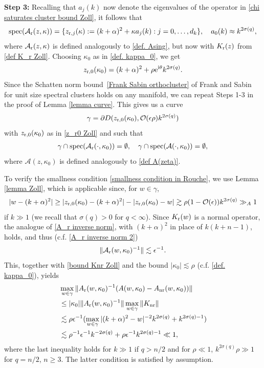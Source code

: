 \documentclass[12pt]{amsart}
\newcommand{\e}{{\rm e}}
\newcommand\eps{\epsilon}
\newcommand\I{\mathrm{i}}
\DeclareMathOperator{\spec}{spec}
\begin{document}
\textbf{Step 3:}
Recalling that $a_j(k)$ now denote the eigenvalues of the operator in \eqref{chi saturates cluster bound Zoll}, it follows that
\begin{align}
    \spec(\mathcal{A}_{\rm r}(z,\kappa))=\{z_{{\rm r},j}(\kappa):=(k+\alpha)^2+\kappa a_{j}(k): j=0,\ldots,d_k\},\quad a_0(k)\approx k^{2\sigma(q)},
\end{align}
where $\mathcal{A}_{\rm r}(z,\kappa)$ is defined analogously to \eqref{def. Asing}, but now with $K_{\rm r}(z)$ from \eqref{def K_r Zoll}. Choosing $\kappa_0$ as in \eqref{def. kappa_0}, we get
\begin{align}\label{z_r0 Zoll}
    z_{{\rm r},0}(\kappa_{0})=(k+\alpha)^2+\rho\e^{\I\theta}k^{2\sigma(q)}.
\end{align}
Since the Schatten norm bound~\eqref{Frank Sabin orthocluster} of Frank and Sabin~\cite{MR3682666} for unit size spectral clusters holds on any manifold, 
we can repeat Steps 1-3 in the proof of Lemma \ref{lemma curve}. This gives us a curve
\begin{align}
   \gamma=\partial D(z_{{\rm r},0}(\kappa_{0}),\mathcal{O}(\eps\rho) k^{2\sigma(q)})
\end{align}
with $z_{{\rm r},0}(\kappa_{0})$ as in \eqref{z_r0 Zoll} and such that
\begin{align}
    \gamma\cap \spec(\mathcal{A}_{\rm r}(\cdot,\kappa_0))=\emptyset,\quad \gamma\cap \spec(\mathcal{A}(\cdot,\kappa_0))=\emptyset,
\end{align}
where $\mathcal{A}(z,\kappa_0)$ is defined analogously to \eqref{def A(zeta)}. 

To verify the smallness condition \eqref{smallness condition in Rouche}, we use Lemma \ref{lemma Zoll}, which is applicable since, for $w\in\gamma$, 
\begin{align}
    |w-(k+\alpha)^2|\geq |z_{{\rm r},0}(\kappa_{0})-(k+\alpha)^2|-|z_{{\rm r},0}(\kappa_{0})-w|\gtrsim \rho(1-\mathcal{O}(\eps))k^{2\sigma(q)}\gg_A 1
\end{align}
if $k\gg 1$ (we recall that $\sigma(q)>0$ for $q<\infty$). Since $K_{\rm r}(w)$ is a normal operator, the analogue of \eqref{A_r inverse norm}, with $(k+\alpha)^2$ in place of $k(k+n-1)$, holds, and thus (c.f. \eqref{A_r inverse norm 2})
\begin{align*}
     \|\mathcal{A}_{\rm r}(w,\kappa_0)^{-1}\|\lesssim \eps^{-1}.
\end{align*}
This, together with \eqref{bound Knr Zoll} and the bound $|\kappa_0|\lesssim\rho$ (c.f. \eqref{def. kappa_0}), yields
\begin{align}
&\max_{w\in\gamma}\|A_{\rm r}(w,\kappa_{0})^{-1}(A(w,\kappa_{0})-A_{\rm nr}(w,\kappa_{0}))\|\\
&\leq |\kappa_0|\|A_{\rm r}(w,\kappa_{0})^{-1}\| \max_{w\in\gamma}\|K_{\rm nr}\|\\
&\lesssim\rho\eps^{-1}(\max_{w\in\gamma}|(k+\alpha)^2-w|^{-2}k^{2\sigma(q)}+k^{2\sigma(q)-1})\\
&\lesssim \rho^{-1}\eps^{-1}k^{-2\sigma(q)}+\rho\eps^{-1}k^{2\sigma(q)-1}
\ll 1,
\end{align}
where the last inequality holds for $k\gg 1$ if $q>n/2$ and for $\rho\ll 1$, $k^{2\sigma(q)}\rho\gg 1$ for $q=n/2$, $n\geq 3$. The latter condition is satisfied by assumption.
\end{document}

